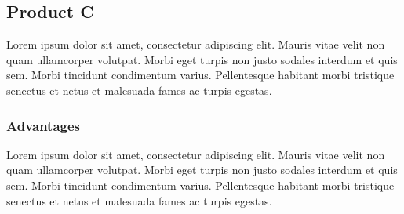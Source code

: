 \documentclass[11pt,titlepage]{article}
\begin{document}
\subsection{Product C}
Lorem ipsum dolor sit amet, consectetur adipiscing elit. Mauris vitae velit 
non quam ullamcorper volutpat. Morbi eget turpis non justo sodales interdum 
et quis sem. Morbi tincidunt condimentum varius. Pellentesque habitant morbi 
tristique senectus et netus et malesuada fames ac turpis egestas.\newline
\subsubsection{Advantages}
Lorem ipsum dolor sit amet, consectetur adipiscing elit. Mauris vitae velit 
non quam ullamcorper volutpat. Morbi eget turpis non justo sodales interdum 
et quis sem. Morbi tincidunt condimentum varius. Pellentesque habitant morbi 
tristique senectus et netus et malesuada fames ac turpis egestas.\newline
\end{document}
